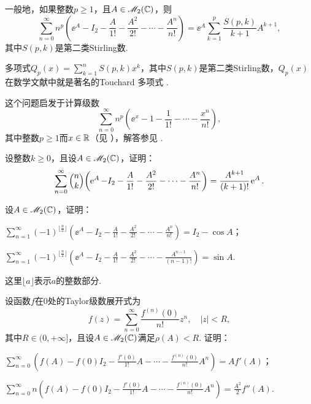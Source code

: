 \begin{remark}

  一般地，如果整数$p\ge1$，且$A\in\mathscr M_2(\mathbb C)$，则
  \[
    \sum_{n=0}^\infty n^p\left( \ee^A - I_2 - \frac A{1!} - \frac{A^2}{2!} - \cdots - \frac{A^n}{n!}\right) = \ee^A\sum_{k=1}^p \frac{S(p,k)}{k+1}A^{k+1},
  \]
  其中$S(p,k)$是{\kaishu 第二类Stirling数}\cite[p.58]{59}.

  多项式$Q_p(x)=\sum_{k=1}^nS(p,k)x^k$，其中$S(p,k)$是第二类Stirling数，$Q_p(x)$在数学文献中就是著名的{Touchard 多项式} \cite{13}.

  这个问题启发于计算级数
  \[
    \sum_{n=0}^\infty n^p\left( \ee^x - 1 - \frac 1{1!} - \cdots - \frac{x^n}{n!}\right),
  \]
  其中整数$p\ge1$而$x\in\mathbb R$（见 \cite{24}），解答参见 \cite{44}.
\end{remark}

\begin{mybox}
  \begin{problem}
    设整数$k\ge0$，且设$A\in\mathscr M_2(\mathbb C)$，证明：
    \[
      \sum_{n=0}^\infty \Binom nk\left( \ee^A - I_2 - \frac A{1!} - \frac{A^2}{2!} - \cdots - \frac{A^n}{n!}\right) = \frac{A^{k+1}}{(k+1)!}\ee^A.
    \]
  \end{problem}
\end{mybox}

\begin{mybox}
  \begin{problem}
    设$A\in\mathscr M_2(\mathbb C)$，证明：
    \begin{enum}
      \item $\sum_{n=1}^\infty (-1)^{\lfloor \frac n2\rfloor}\left( \ee^A - I_2 - \frac A{1!} - \frac{A^2}{2!} - \cdots - \frac{A^n}{n!}\right) = I_2-\cos A$；
      \item $\sum_{n=1}^\infty (-1)^{\lfloor \frac n2\rfloor}\left( \ee^A - I_2 - \frac A{1!} - \frac{A^2}{2!} - \cdots - \frac{A^{n-1}}{(n-1)!}\right) = \sin A$.
    \end{enum}
    这里$\lfloor a\rfloor$表示$a$的整数部分.
  \end{problem}
\end{mybox}

\begin{mybox}
  \begin{problem}
    设函数$f$在0处的Taylor级数展开式为
    \[
      f(z) = \sum_{n=0}^\infty \frac{f^{(n)}(0)}{n!}z^n,\quad |z|<R,
    \]
    其中$R\in(0,+\infty]$，且设$A\in\mathscr M_2(\mathbb C)$满足$\rho(A)<R$. 证明：
    \begin{enum}
      \item $\sum_{n=0}^\infty \left(f(A)-f(0)I_2-\frac{f'(0)}{1!}A-\cdots-
          \frac{f^{(n)}(0)}{n!}A^n\right)=Af'(A)$；
      \item $\sum_{n=0}^\infty n\left(f(A)-f(0)I_2-\frac{f'(0)}{1!}A-\cdots-
          \frac{f^{(n)}(0)}{n!}A^n\right)=\frac{A^2}2 f''(A)$.
    \end{enum}
  \end{problem}
\end{mybox}

